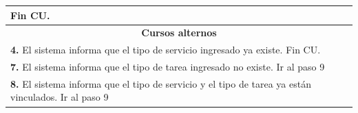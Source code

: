 \documentclass[12pt]{extarticle}
\begin{document}
\begin{spacing}{1.2}
\begin{longtable}{ |p{8cm}|p{8cm}| }


			\inc Fin CU. & \\
		\hline
		\multicolumn{2}{|c|}{\textbf{Cursos alternos}}\\
		\hline
		\multicolumn{2}{|p{16cm}|}{\textbf{4. }El sistema informa que el tipo de servicio ingresado ya existe. Fin CU.}\\
		\hline
		\multicolumn{2}{|p{16cm}|}{\textbf{7. }El sistema informa que el tipo de tarea ingresado no existe. Ir al paso 9}\\
		\hline	
		\multicolumn{2}{|p{16cm}|}{\textbf{8. }El sistema informa que el tipo de servicio y el tipo de tarea ya están vinculados. Ir al paso 9}\\
		\hline	
	\end{longtable}


\end{spacing}
\end{document}
